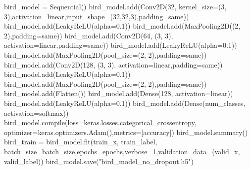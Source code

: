 \documentclass[
  letterpaper,
  DIV=11,
  numbers=noendperiod]{scrartcl}
\newenvironment{Shaded}{\begin{snugshade}}{\end{snugshade}}
\newcommand{\BuiltInTok}[1]{\textcolor[rgb]{0.00,0.23,0.31}{#1}}
\newcommand{\DecValTok}[1]{\textcolor[rgb]{0.68,0.00,0.00}{#1}}
\newcommand{\FloatTok}[1]{\textcolor[rgb]{0.68,0.00,0.00}{#1}}
\newcommand{\NormalTok}[1]{\textcolor[rgb]{0.00,0.23,0.31}{#1}}
\newcommand{\OperatorTok}[1]{\textcolor[rgb]{0.37,0.37,0.37}{#1}}
\newcommand{\StringTok}[1]{\textcolor[rgb]{0.13,0.47,0.30}{#1}}
\begin{document}
\begin{Shaded}
\begin{Highlighting}[]
\NormalTok{bird\_model }\OperatorTok{=}\NormalTok{ Sequential()}
\NormalTok{bird\_model.add(Conv2D(}\DecValTok{32}\NormalTok{, kernel\_size}\OperatorTok{=}\NormalTok{(}\DecValTok{3}\NormalTok{, }\DecValTok{3}\NormalTok{),activation}\OperatorTok{=}\StringTok{\textquotesingle{}linear\textquotesingle{}}\NormalTok{,input\_shape}\OperatorTok{=}\NormalTok{(}\DecValTok{32}\NormalTok{,}\DecValTok{32}\NormalTok{,}\DecValTok{3}\NormalTok{),padding}\OperatorTok{=}\StringTok{\textquotesingle{}same\textquotesingle{}}\NormalTok{))}
\NormalTok{bird\_model.add(LeakyReLU(alpha}\OperatorTok{=}\FloatTok{0.1}\NormalTok{))}
\NormalTok{bird\_model.add(MaxPooling2D((}\DecValTok{2}\NormalTok{, }\DecValTok{2}\NormalTok{),padding}\OperatorTok{=}\StringTok{\textquotesingle{}same\textquotesingle{}}\NormalTok{))}
\NormalTok{bird\_model.add(Conv2D(}\DecValTok{64}\NormalTok{, (}\DecValTok{3}\NormalTok{, }\DecValTok{3}\NormalTok{), activation}\OperatorTok{=}\StringTok{\textquotesingle{}linear\textquotesingle{}}\NormalTok{,padding}\OperatorTok{=}\StringTok{\textquotesingle{}same\textquotesingle{}}\NormalTok{))}
\NormalTok{bird\_model.add(LeakyReLU(alpha}\OperatorTok{=}\FloatTok{0.1}\NormalTok{))}
\NormalTok{bird\_model.add(MaxPooling2D(pool\_size}\OperatorTok{=}\NormalTok{(}\DecValTok{2}\NormalTok{, }\DecValTok{2}\NormalTok{),padding}\OperatorTok{=}\StringTok{\textquotesingle{}same\textquotesingle{}}\NormalTok{))}
\NormalTok{bird\_model.add(Conv2D(}\DecValTok{128}\NormalTok{, (}\DecValTok{3}\NormalTok{, }\DecValTok{3}\NormalTok{), activation}\OperatorTok{=}\StringTok{\textquotesingle{}linear\textquotesingle{}}\NormalTok{,padding}\OperatorTok{=}\StringTok{\textquotesingle{}same\textquotesingle{}}\NormalTok{))}
\NormalTok{bird\_model.add(LeakyReLU(alpha}\OperatorTok{=}\FloatTok{0.1}\NormalTok{))                  }
\NormalTok{bird\_model.add(MaxPooling2D(pool\_size}\OperatorTok{=}\NormalTok{(}\DecValTok{2}\NormalTok{, }\DecValTok{2}\NormalTok{),padding}\OperatorTok{=}\StringTok{\textquotesingle{}same\textquotesingle{}}\NormalTok{))}
\NormalTok{bird\_model.add(Flatten())}
\NormalTok{bird\_model.add(Dense(}\DecValTok{128}\NormalTok{, activation}\OperatorTok{=}\StringTok{\textquotesingle{}linear\textquotesingle{}}\NormalTok{))}
\NormalTok{bird\_model.add(LeakyReLU(alpha}\OperatorTok{=}\FloatTok{0.1}\NormalTok{))                  }
\NormalTok{bird\_model.add(Dense(num\_classes, activation}\OperatorTok{=}\StringTok{\textquotesingle{}softmax\textquotesingle{}}\NormalTok{))}
\NormalTok{bird\_model.}\BuiltInTok{compile}\NormalTok{(loss}\OperatorTok{=}\NormalTok{keras.losses.categorical\_crossentropy, optimizer}\OperatorTok{=}\NormalTok{keras.optimizers.Adam(),metrics}\OperatorTok{=}\NormalTok{[}\StringTok{\textquotesingle{}accuracy\textquotesingle{}}\NormalTok{])}
\NormalTok{bird\_model.summary()}
\NormalTok{bird\_train }\OperatorTok{=}\NormalTok{ bird\_model.fit(train\_x, train\_label, batch\_size}\OperatorTok{=}\NormalTok{batch\_size,epochs}\OperatorTok{=}\NormalTok{epochs,verbose}\OperatorTok{=}\DecValTok{1}\NormalTok{,validation\_data}\OperatorTok{=}\NormalTok{(valid\_x, valid\_label))}
\NormalTok{bird\_model.save(}\StringTok{"bird\_model\_no\_dropout.h5"}\NormalTok{)}
\end{Highlighting}
\end{Shaded}
\end{document}
